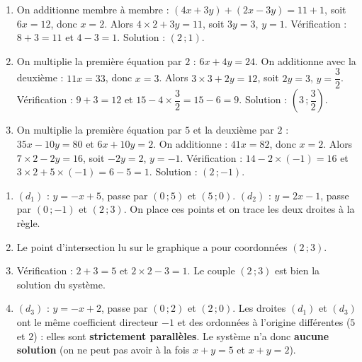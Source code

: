 \documentclass[11pt]{article}
\begin{document}
\begin{corrige}
\begin{enumerate}
\item On additionne membre à membre : $(4x+3y)+(2x-3y)=11+1$, soit $6x=12$, donc $x=2$. Alors $4\times 2+3y=11$, soit $3y=3$, $y=1$. Vérification : $8+3=11$ et $4-3=1$. Solution : $(2\,;1)$.
\item On multiplie la première équation par $2$ : $6x+4y=24$. On additionne avec la deuxième : $11x=33$, donc $x=3$. Alors $3\times 3+2y=12$, soit $2y=3$, $y=\dfrac{3}{2}$. Vérification : $9+3=12$ et $15-4\times\dfrac{3}{2}=15-6=9$. Solution : $\left(3\,;\dfrac{3}{2}\right)$.
\item On multiplie la première équation par $5$ et la deuxième par $2$ : $35x-10y=80$ et $6x+10y=2$. On additionne : $41x=82$, donc $x=2$. Alors $7\times 2-2y=16$, soit $-2y=2$, $y=-1$. Vérification : $14-2\times(-1)=16$ et $3\times 2+5\times(-1)=6-5=1$. Solution : $(2\,;-1)$.
\end{enumerate}
\end{corrige}

\begin{corrige}
\begin{enumerate}
\item $(d_1)$ : $y=-x+5$, passe par $(0\,;5)$ et $(5\,;0)$. $(d_2)$ : $y=2x-1$, passe par $(0\,;-1)$ et $(2\,;3)$. On place ces points et on trace les deux droites à la règle.
\item Le point d'intersection lu sur le graphique a pour coordonnées $(2\,;3)$.
\item Vérification : $2+3=5$ et $2\times 2-3=1$. Le couple $(2\,;3)$ est bien la solution du système.
\item $(d_3)$ : $y=-x+2$, passe par $(0\,;2)$ et $(2\,;0)$. Les droites $(d_1)$ et $(d_3)$ ont le même coefficient directeur $-1$ et des ordonnées à l'origine différentes ($5$ et $2$) : elles sont \textbf{strictement parallèles}. Le système n'a donc \textbf{aucune solution} (on ne peut pas avoir à la fois $x+y=5$ et $x+y=2$).
\end{enumerate}
\end{corrige}
\end{document}
